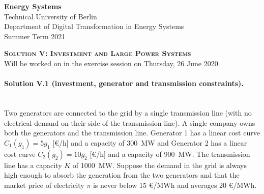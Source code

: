 \documentclass[11pt,a4paper,fleqn]{scrartcl}
\begin{document}
\begin{flushright}
  \textbf{Energy Systems}\\
  {\small Technical University of Berlin}\\
  {\small Department of Digital Transformation in Energy Systems}\\
  {\small Summer Term 2021}\\
 \end{flushright}
 
  
  \vspace{-0.5em}
  \hrulefill
  \vspace{0.3em}
 
 \begin{center}
  \textbf{\textsc{\Large Solution V: Investment and Large Power Systems}}\\
  \small Will be worked on in the exercise session on Thursday, 26 June 2020.\\[1.5em]
 \end{center}
 
 \vspace{-0.5em}
 \hrulefill
 \vspace{0.8em}

\paragraph{Solution V.1 \normalsize (investment, generator and transmission constraints).}~\\

Two generators are connected to the grid by a single transmission
line (with no electrical demand on their side of the transmission line). A single company owns both the generators and the transmission line. Generator 1 has a linear cost curve $C_1(g_1) = 5 g_1$ [\euro/h] and a capacity of 300~MW and Generator 2 has a linear cost curve $C_2(g_2) = 10 g_2$ [\euro/h] and a capacity of 900~MW. The transmission line has a capacity $K$ of 1000~MW. Suppose the demand in the grid is always high enough to absorb the
generation from the two generators and that the market price of
electricity $\pi$ is never below 15 \euro/MWh and averages 20
\euro/MWh.
\end{document}
